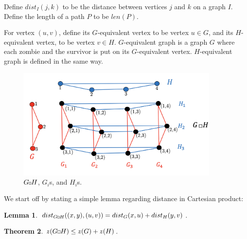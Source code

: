 \documentclass[1p]{elsarticle}
\newtheorem{theorem}{Theorem}
\newtheorem{lemma}[theorem]{Lemma}
\newcommand{\zn}{\ooalign{$z$\cr\hfil\rule[.5ex]{.2em}{.08ex}\hfil\cr}}
\newcommand{\sq}[1][black]{%
\begin{tikzpicture}                                                           
  \draw[#1] (2pt,0pt) -- (6pt,0pt);   
  \draw[#1] (2pt,0pt) -- (2pt,4pt);    
  \draw[#1] (2pt,4pt) -- (6pt,4pt);   
  \draw[#1] (6pt,0pt) -- (6pt,4pt);
\end{tikzpicture}%
}
\newcommand{\sqSmall}[1][black]{%
\begin{tikzpicture}                                                           
  \draw[#1] (1.5pt,0pt) -- (4.5pt,0pt);   
  \draw[#1] (1.5pt,0pt) -- (1.5pt,3pt);    
  \draw[#1] (1.5pt,3pt) -- (4.5pt,3pt);   
  \draw[#1] (4.5pt,0pt) -- (4.5pt,3pt);
\end{tikzpicture}%
}
\begin{document}
Define $dist_I(j,k)$ to be the distance between vertices $j$ and $k$ on a graph $I$. Define the length of a path $P$ to be $len(P)$. 

For vertex $(u,v)$, define its $G$-equivalent vertex to be vertex $u \in G$, and its $H$-equivalent vertex, to be vertex
$v \in H$. $G$-equivalent graph is a graph $G$ where each zombie and the survivor is put on its $G$-equivalent vertex.
$H$-equivalent graph is defined in the same way.


\begin{figure}[h!]
	
	\centering
	\includegraphics[width=0.9\textwidth]{fig/cp3.png}
	\caption{$G \sqSmall H$, $G_i$s, and $H_i$s.}
	\label{fig:p1}
\end{figure}


We start off by stating a simple lemma regarding distance in Cartesian product:
\begin{lemma} \label{shortestpathlemma}
	$dist_{G \sqSmall H}((x,y),(u,v)) = dist_G(x,u) + dist_H(y,v)$.
\end{lemma}


\begin{theorem}
	\label{T2}
	$\zn(G \sq H) \leq \zn(G) + \zn(H)$.
\end{theorem}
\end{document}
